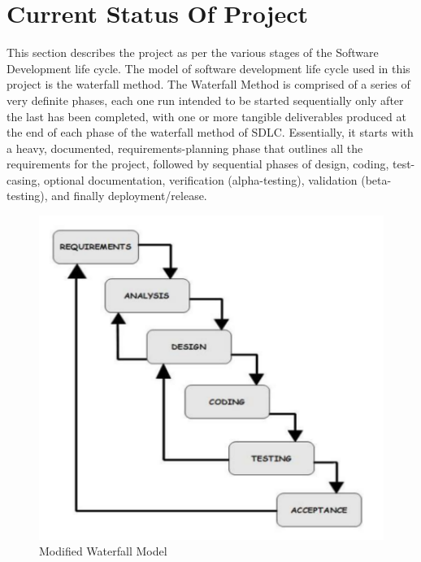 \section{Current Status Of Project}

This section describes the project as per the various stages of the Software Development life
cycle. The model of software development life cycle used in this project is the waterfall method.
The Waterfall Method is comprised of a series of very definite phases, each one run intended to
be started sequentially only after the last has been completed, with one or more tangible
deliverables produced at the end of each phase of the waterfall method of SDLC. Essentially, it
starts with a heavy, documented, requirements-planning phase that outlines all the requirements
for the project, followed by sequential phases of design, coding, test-casing, optional
documentation, verification (alpha-testing), validation (beta-testing), and finally
deployment/release.\\
\begin{figure}[H]
\centering \includegraphics[scale=0.5]{image/sdlc.png}
\caption{Modified Waterfall Model}
\end{figure}

